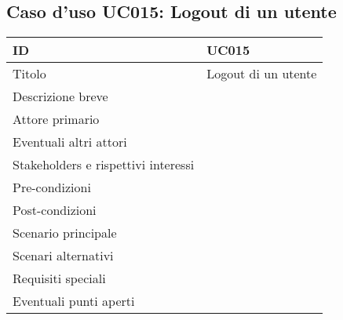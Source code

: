 \documentclass[../../main.tex]{subfiles}
\begin{document}
\subsection{Caso d’uso UC015: Logout di un utente }
\begin{tabularx}{150mm}{|l|X|}
    \hline
    ID                                  & \textbf{UC015}\\
    \hline
    Titolo                              & Logout di un utente \\
    \hline
    Descrizione breve                   &    \\
    \hline
    Attore primario                     &    \\
    \hline
    Eventuali altri attori              &    \\
    \hline
    Stakeholders e rispettivi interessi &    \\
    \hline
    Pre-condizioni                      &    \\
    \hline
    Post-condizioni                     &    \\
    \hline
    Scenario principale                 &    \\
    \hline
    Scenari alternativi                 &    \\
    \hline
    Requisiti speciali                  &    \\
    \hline
    Eventuali punti aperti              &    \\
    \hline
\end{tabularx}
\newpage
\end{document}

